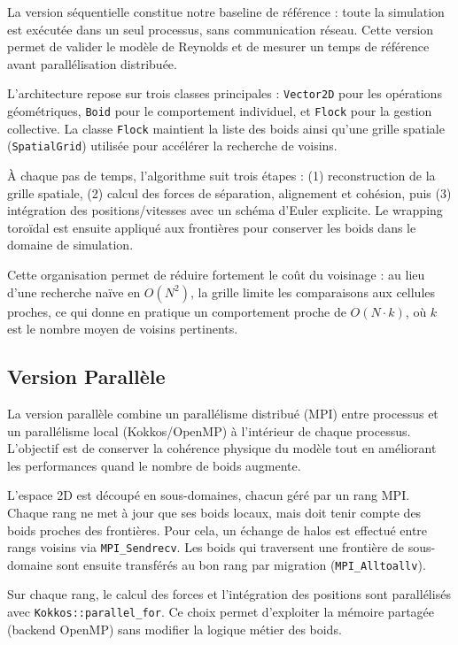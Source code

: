 \documentclass[conference]{IEEEtran}
\begin{document}
La version séquentielle constitue notre baseline de référence : toute la simulation est exécutée dans un seul processus, sans communication réseau. Cette version permet de valider le modèle de Reynolds et de mesurer un temps de référence avant parallélisation distribuée.

L'architecture repose sur trois classes principales : \texttt{Vector2D} pour les opérations géométriques, \texttt{Boid} pour le comportement individuel, et \texttt{Flock} pour la gestion collective. La classe \texttt{Flock} maintient la liste des boids ainsi qu'une grille spatiale (\texttt{SpatialGrid}) utilisée pour accélérer la recherche de voisins.

À chaque pas de temps, l'algorithme suit trois étapes : (1) reconstruction de la grille spatiale, (2) calcul des forces de séparation, alignement et cohésion, puis (3) intégration des positions/vitesses avec un schéma d'Euler explicite. Le wrapping toroïdal est ensuite appliqué aux frontières pour conserver les boids dans le domaine de simulation.

Cette organisation permet de réduire fortement le coût du voisinage : au lieu d'une recherche naïve en $O(N^2)$, la grille limite les comparaisons aux cellules proches, ce qui donne en pratique un comportement proche de $O(N \cdot k)$, où $k$ est le nombre moyen de voisins pertinents.

\subsection{Version Parallèle}

La version parallèle combine un parallélisme distribué (MPI) entre processus et un parallélisme local (Kokkos/OpenMP) à l'intérieur de chaque processus. L'objectif est de conserver la cohérence physique du modèle tout en améliorant les performances quand le nombre de boids augmente.

L'espace 2D est découpé en sous-domaines, chacun géré par un rang MPI. Chaque rang ne met à jour que ses boids locaux, mais doit tenir compte des boids proches des frontières. Pour cela, un échange de halos est effectué entre rangs voisins via \texttt{MPI\_Sendrecv}. Les boids qui traversent une frontière de sous-domaine sont ensuite transférés au bon rang par migration (\texttt{MPI\_Alltoallv}).

Sur chaque rang, le calcul des forces et l'intégration des positions sont parallélisés avec \texttt{Kokkos::parallel\_for}. Ce choix permet d'exploiter la mémoire partagée (backend OpenMP) sans modifier la logique métier des boids.
\end{document}
